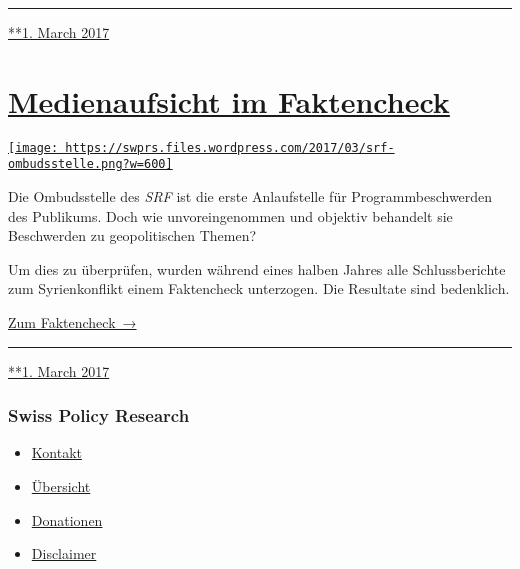 \begin{center}\rule{0.5\linewidth}{\linethickness}\end{center}

\href{https://swprs.org/2017/03/01/srg-idee-suisse/}{**1. March 2017}

\hypertarget{medienaufsicht-im-faktencheck}{%
\section{\texorpdfstring{\href{https://swprs.org/2017/03/01/medienaufsicht-faktencheck/}{Medienaufsicht
im
Faktencheck}}{Medienaufsicht im Faktencheck}}\label{medienaufsicht-im-faktencheck}}

\href{https://swprs.org/2017/03/01/medienaufsicht-faktencheck/}{\texttt{[image: https://swprs.files.wordpress.com/2017/03/srf-ombudsstelle.png?w=600]}}

Die Ombudsstelle des \emph{SRF} ist die erste Anlaufstelle für
Programm­be­schwerden des Publi­kums. Doch wie un­vor­ein­ge­nommen und
objektiv behandelt sie Beschwerden zu geo­po­li­tischen Themen?

Um dies zu über­prüfen, wurden während eines halben Jahres alle
Schluss­be­richte zum Syrien­kon­flikt einem Fakten­check unter­zogen.
Die Resul­tate sind bedenk­lich.

\href{https://swprs.org/srf-ombudsstelle-im-faktencheck/}{Zum
Faktencheck~→}

\begin{center}\rule{0.5\linewidth}{\linethickness}\end{center}

\href{https://swprs.org/2017/03/01/medienaufsicht-faktencheck/}{**1.
March 2017}

\hypertarget{swiss-policy-research}{%
\subsubsection{Swiss Policy Research}\label{swiss-policy-research}}

\begin{itemize}
\tightlist
\item
  \href{https://swprs.org/kontakt/}{Kontakt}
\item
  \href{https://swprs.org/uebersicht/}{Übersicht}
\item
  \href{https://swprs.org/donationen/}{Donationen}
\item
  \href{https://swprs.org/disclaimer/}{Disclaimer}
\end{itemize}


